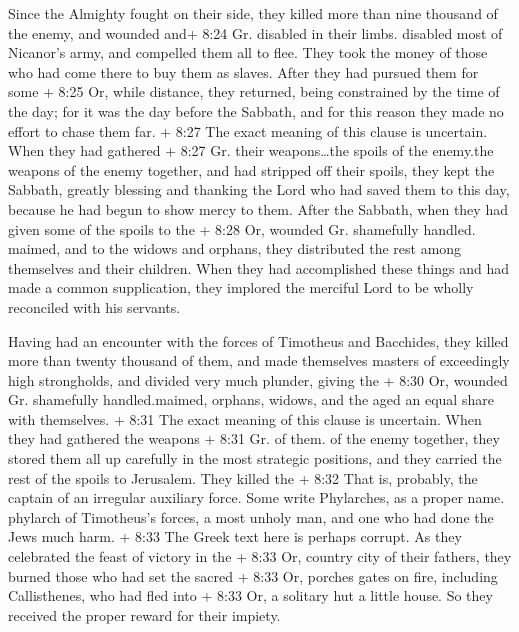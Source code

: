  Since the Almighty fought on their side, they killed more
than nine thousand of the enemy, and wounded and+ 8:24 Gr. disabled in
their limbs. disabled most of Nicanor's army, and compelled them all to
flee.  They took the money of those who had come there to
buy them as slaves. After they had pursued them for some + 8:25 Or,
while distance, they returned, being constrained by the time of the day;
 for it was the day before the Sabbath, and for this reason
they made no effort to chase them far.  + 8:27 The exact
meaning of this clause is uncertain. When they had gathered + 8:27 Gr.
their weapons\ldots the spoils of the enemy.the weapons of the enemy
together, and had stripped off their spoils, they kept the Sabbath,
greatly blessing and thanking the Lord who had saved them to this day,
because he had begun to show mercy to them.  After the
Sabbath, when they had given some of the spoils to the + 8:28 Or,
wounded Gr. shamefully handled. maimed, and to the widows and orphans,
they distributed the rest among themselves and their children.
 When they had accomplished these things and had made a
common supplication, they implored the merciful Lord to be wholly
reconciled with his servants.

 Having had an encounter with the forces of Timotheus and
Bacchides, they killed more than twenty thousand of them, and made
themselves masters of exceedingly high strongholds, and divided very
much plunder, giving the + 8:30 Or, wounded Gr. shamefully
handled.maimed, orphans, widows, and the aged an equal share with
themselves.  + 8:31 The exact meaning of this clause is
uncertain. When they had gathered the weapons + 8:31 Gr. of them. of the
enemy together, they stored them all up carefully in the most strategic
positions, and they carried the rest of the spoils to Jerusalem.
 They killed the + 8:32 That is, probably, the captain of
an irregular auxiliary force. Some write Phylarches, as a proper name.
phylarch of Timotheus's forces, a most unholy man, and one who had done
the Jews much harm.  + 8:33 The Greek text here is perhaps
corrupt. As they celebrated the feast of victory in the + 8:33 Or,
country city of their fathers, they burned those who had set the sacred
+ 8:33 Or, porches gates on fire, including Callisthenes, who had fled
into + 8:33 Or, a solitary hut a little house. So they received the
proper reward for their impiety.

